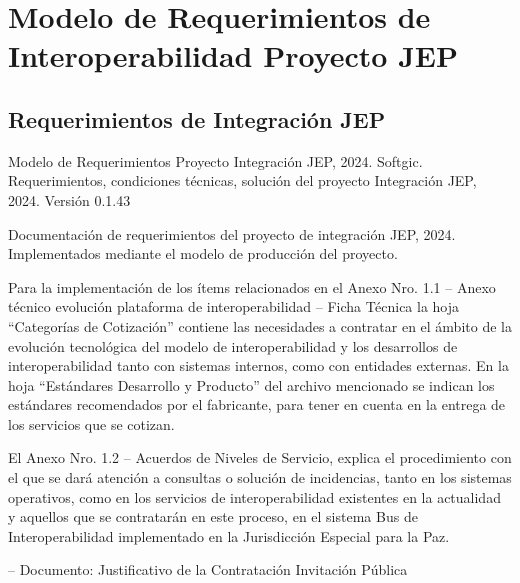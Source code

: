 \documentclass[
  paper=a4,
  ,captions=tableheading
]{scrartcl}
\renewenvironment{quote}{\begin{customblockquote}\list{}{\rightmargin=0em\leftmargin=0em}%
\item\relax\color{blockquote-text}\ignorespaces}{\unskip\unskip\endlist\end{customblockquote}}
\begin{document}
\newpage

\section{Modelo de Requerimientos de Interoperabilidad Proyecto
JEP}\label{sec:modelo-de-requerimientos-de-interoperabilidad-proyecto-jep}

\subsection{Requerimientos de Integración
JEP}\label{sec:requerimientos-de-integraciuxf3n-jep}

\begin{quote}
Modelo de Requerimientos Proyecto Integración JEP, 2024. Softgic.
Requerimientos, condiciones técnicas, solución del proyecto Integración
JEP, 2024. Versión 0.1.43
\end{quote}

Documentación de requerimientos del proyecto de integración JEP, 2024.
Implementados mediante el modelo de producción del proyecto.

Para la implementación de los ítems relacionados en el Anexo Nro. 1.1 --
Anexo técnico evolución plataforma de interoperabilidad -- Ficha Técnica
la hoja ``Categorías de Cotización'' contiene las necesidades a
contratar en el ámbito de la evolución tecnológica del modelo de
interoperabilidad y los desarrollos de interoperabilidad tanto con
sistemas internos, como con entidades externas. En la hoja ``Estándares
Desarrollo y Producto'' del archivo mencionado se indican los estándares
recomendados por el fabricante, para tener en cuenta en la entrega de
los servicios que se cotizan.

El Anexo Nro. 1.2 -- Acuerdos de Niveles de Servicio, explica el
procedimiento con el que se dará atención a consultas o solución de
incidencias, tanto en los sistemas operativos, como en los servicios de
interoperabilidad existentes en la actualidad y aquellos que se
contratarán en este proceso, en el sistema Bus de Interoperabilidad
implementado en la Jurisdicción Especial para la Paz.

-- Documento: Justificativo de la Contratación Invitación Pública
\end{document}
